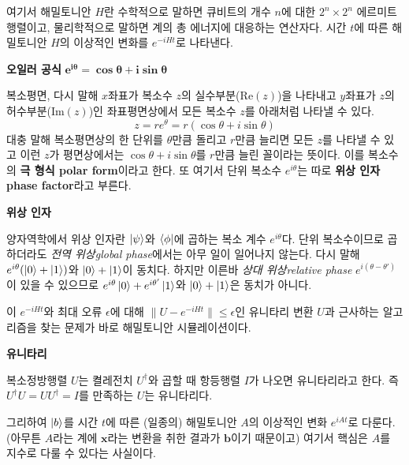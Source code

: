 \documentclass[a4paper,atbegshi,chapter,itemph,hidelinks]{oblivoir}
\begin{document}
\begin{mdframed}
  여기서 해밀토니안 $H$란 수학적으로 말하면 큐비트의 개수 $n$에 대한
  $2^n\times 2^n$ 에르미트 행렬이고, 물리학적으로 말하면 계의 총 에너지에
  대응하는 연산자다. 시간 $t$에 따른 해밀토니안 $H$의 이상적인 변화를
  $e^{-iHt}$로 나타낸다. 
  \begin{mdframed}
    \begin{center}\textbf{오일러 공식} $\pmb{e^{i\theta}=\cos\theta+
    i\sin\theta}$ \end{center}
    복소평면, 다시 말해 $x$좌표가 복소수 $z$의 실수부분($\textrm{Re}(z)$)을
    나타내고 $y$좌표가 $z$의 허수부분($\textrm{Im}(z)$)인 좌표평면상에서
    모든 복소수 $z$를 아래처럼 나타낼 수 있다.
    \[
      z=re^{\theta}=r(\cos\theta+i\sin\theta)
    \]
    대충 말해 복소평면상의 한 단위를 $\theta$만큼 돌리고 $r$만큼 늘리면
    모든 $z$를 나타낼 수 있고 이런 $z$가 평면상에서는 $\cos\theta+i\sin\theta$를
    $r$만큼 늘린 꼴이라는 뜻이다. 이를 복소수의 \textbf{극 형식\footnotesize
    polar form}이라고 한다. 또 여기서 단위 복소수 $e^{i\theta}$는 따로
    \textbf{위상 인자\footnotesize phase factor}라고 부른다.
    \begin{mdframed}
      \begin{center}\textbf{위상 인자}\end{center}\noindent
      양자역학에서 위상 인자란 $\ket{\psi}$와 $\bra{\phi}$에 곱하는
      복소 계수 $e^{i\theta}$다. 단위 복소수이므로 곱하더라도 
      \emph{전역 위상\footnotesize global phase}에서는 아무 일이 일어나지
      않는다. 다시 말해 $e^{i\theta}(\ket0+\ket1)$와 $\ket0+\ket1$이 동치다.
      하지만 이른바 \emph{상대 위상\emph relative phase}
      $e^{i(\theta-\theta')}$이 있을 수 있으므로 
      $e^{i\theta}\ket0+e^{i\theta'}\ket1$와 $\ket0+\ket1$은 동치가 아니다.
    \end{mdframed}
  \end{mdframed}
  이 $e^{-iHt}$와
  최대 오류 $\epsilon$에 대해 $\|U-e^{-iHt}\|\leq\epsilon$인
  유니타리 변환 $U$과 근사하는 알고리즘을 찾는 문제가 바로 해밀토니안
  시뮬레이션이다.
  \begin{mdframed}
    \begin{center}\textbf{유니타리}\end{center}
    \noindent 복소정방행렬 $U$는 켤레전치 $U^{\dagger}$와 곱할 때 항등행렬
    $I$가 나오면 유니타리라고 한다. 즉 $U^{\dagger}U=UU^{\dagger}=I$를
    만족하는 $U$는 유니타리다.
  \end{mdframed}
\end{mdframed}
그리하여 $\ket{b}$를 시간 $t$에 따른 (일종의) 해밀토니안 $A$의 이상적인 변화
$e^{iAt}$로 다룬다. (아무튼 $A$라는 계에 $\mathbf{x}$라는 변환을 취한 결과가 
$\mathbf{b}$이기 때문이고) 여기서 핵심은 $A$를 지수로 다룰 수 있다는 사실이다.
\end{document}
